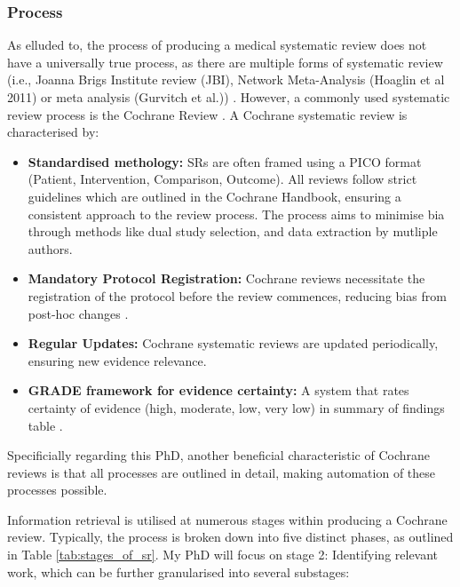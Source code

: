 \documentclass[10pt, english]{article}
\begin{document}
\subsubsection{Process}

As elluded to, the process of producing a medical systematic review does not have a universally true process, as there are multiple forms of systematic review (i.e., Joanna Brigs Institute review (JBI), Network Meta-Analysis (Hoaglin et al 2011) or meta analysis (Gurvitch et al.)) \cite{munn_what_2018}. However, a commonly used systematic review process is the Cochrane Review \cite{cipriani_what_2011}. A Cochrane systematic review is characterised by:
\begin{itemize}
    \item {\bf{Standardised methology:}} SRs are often framed using a PICO format (Patient, Intervention, Comparison, Outcome). All reviews follow strict guidelines which are outlined in the Cochrane Handbook, ensuring a consistent approach to the review process. The process aims to minimise bia through methods like dual study selection, and data extraction by mutliple authors.
    \item {\bf{Mandatory Protocol Registration:}} Cochrane reviews necessitate the registration of the protocol before the review commences, reducing bias from post-hoc changes \cite{cumpston2024planning}.
    \item {\bf{Regular Updates:}} Cochrane systematic reviews are updated periodically, ensuring new evidence relevance. 
    \item {\bf{GRADE framework for evidence certainty:}} A system that rates certainty of evidence (high, moderate, low, very low) in summary of findings table \cite{schunemann2024summary}.
\end{itemize}

Specificially regarding this PhD, another beneficial characteristic of Cochrane reviews is that all processes are outlined in detail, making automation of these processes possible. 



Information retrieval is utilised at numerous stages within producing a Cochrane review. Typically, the process is broken down into five distinct phases, as outlined in  Table \ref{tab:stages_of_sr}.
My PhD will focus on stage 2: Identifying relevant work, which can be further granularised into several substages:
\end{document}
